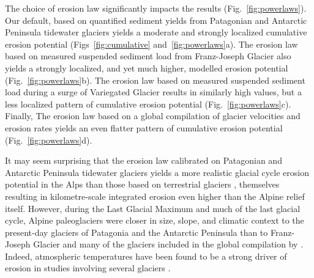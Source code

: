 \documentclass[esurf, manuscript]{copernicus}
\begin{document}
    The choice of erosion law significantly impacts the results
    (Fig.~\ref{fig:powerlaws}). Our default, based on quantified
    sediment yields from Patagonian and Antarctic Peninsula tidewater glaciers
    \citep[${\dot{e}=5.2\times10^{-8}u_\mathrm{b}^{2.34}}$,][]{Koppes.etal.2015}
    yields a moderate and strongly localized cumulative erosion potential
    (Figs~\ref{fig:cumulative} and~\ref{fig:powerlaws}a). The erosion law
    based on measured suspended sediment load from Franz-Joseph Glacier
    \citep[${\dot{e}=2.7\times10^{-7}u_\mathrm{b}^{2.02}}$,][]{Herman.etal.2015}
    also yields a strongly localized, and yet much higher, modelled erosion
    potential (Fig.~\ref{fig:powerlaws}b). The erosion law based on measured
    suspended sediment load during a surge of Variegated Glacier
    \citep[${\dot{e}=1\times10^{-4}u_\mathrm{b}^{1}}$,][]{Humphrey.Raymond.1994}
    results in similarly high values, but a less localized pattern of cumulative
    erosion potential (Fig.~\ref{fig:powerlaws}c). Finally, The erosion law
    based on a global compilation of glacier velocities and erosion rates
    \citep[${\dot{e}=1.665\times10^{-1}u_\mathrm{b}^{0.6459}}$,][]{Cook.etal.2020}
    yields an even flatter pattern of cumulative erosion potential
    (Fig.~\ref{fig:powerlaws}d).

    It may seem surprising that the erosion law calibrated on Patagonian and
    Antarctic Peninsula tidewater glaciers \citep{Koppes.etal.2015} yields a
    more realistic glacial cycle erosion potential in the Alps than those based
    on terrestrial
    glaciers \citep{Humphrey.Raymond.1994, Herman.etal.2015, Cook.etal.2020},
    themselves resulting in kilometre-scale integrated erosion even
    higher than the Alpine relief itself. However, during the Last Glacial
    Maximum and much of the last glacial cycle, Alpine paleoglaciers were
    closer in size, slope, and climatic context to the present-day glaciers of
    Patagonia and the Antarctic Peninsula \citep{Koppes.etal.2015} than to
    Franz-Joseph Glacier \citep{Herman.etal.2015} and many of the glaciers
    included in the global compilation by \citet{Cook.etal.2020}. Indeed,
    atmospheric
    temperatures have been found to be a strong driver of erosion in studies
    involving several glaciers \citep{Koppes.etal.2015, Cook.etal.2020}.
\end{document}

